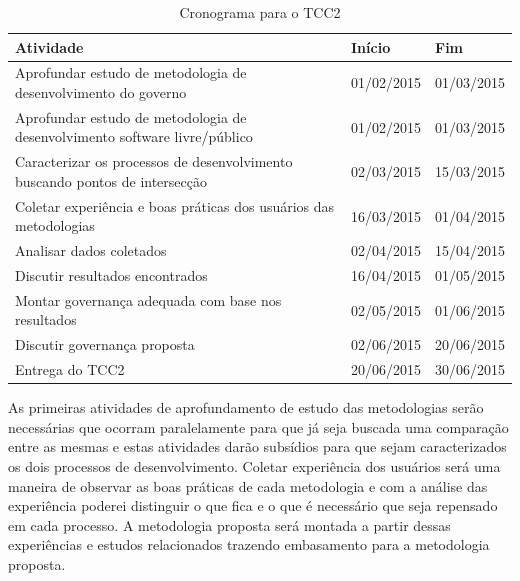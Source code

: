 \begin{table}[htb]
\center
\footnotesize
\begin{tabular}{|p{8cm}|p{3cm}|p{3cm}|}
  \hline
   \textbf{Atividade} & \textbf{Início} & \textbf{Fim}\\
    \hline
	Aprofundar estudo de metodologia de desenvolvimento do governo & 01/02/2015 & 01/03/2015\\
    \hline
	Aprofundar estudo de metodologia de desenvolvimento software livre/público & 01/02/2015 & 01/03/2015\\
    \hline
        Caracterizar os processos de desenvolvimento buscando pontos de intersecção & 02/03/2015 & 15/03/2015\\
    \hline
	Coletar experiência e boas práticas dos usuários das metodologias & 16/03/2015 & 01/04/2015\\
    \hline
	Analisar dados coletados & 02/04/2015 & 15/04/2015\\
    \hline 
	Discutir resultados encontrados & 16/04/2015 & 01/05/2015\\
    \hline
	Montar governança adequada com base nos resultados & 02/05/2015 & 01/06/2015\\
    \hline
	Discutir governança proposta & 02/06/2015 & 20/06/2015\\
    \hline
	Entrega do TCC2 & 20/06/2015 & 30/06/2015\\
    \hline
\end{tabular}
\caption{Cronograma para o TCC2}
\label{cronograma}
\end{table}

As primeiras atividades de aprofundamento de estudo das metodologias serão 
necessárias que ocorram paralelamente para que já seja buscada uma comparação 
entre as mesmas e estas atividades darão subsídios para que sejam caracterizados 
os dois processos de desenvolvimento.
%
Coletar experiência dos usuários será uma maneira de observar as boas práticas de cada 
metodologia e com a análise das experiência poderei distinguir o que fica e o que 
é necessário que seja repensado em cada processo.
%
A metodologia proposta será montada a partir dessas experiências e estudos relacionados
trazendo embasamento para a metodologia proposta. 
